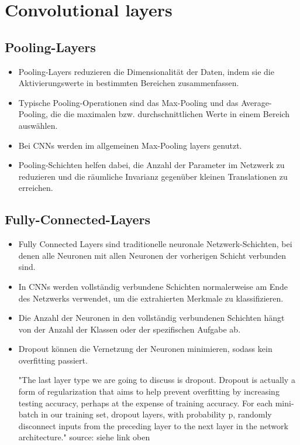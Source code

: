 \section{Convolutional layers}

\subsection{Pooling-Layers}
\begin{itemize}
  \item Pooling-Layers reduzieren die Dimensionalität der Daten, indem sie die Aktivierungswerte in bestimmten Bereichen zusammenfassen.
  \item Typische Pooling-Operationen sind das Max-Pooling und das Average-Pooling, die die maximalen bzw. durchschnittlichen Werte in einem Bereich auswählen.
  \item Bei CNNs werden im allgemeinen Max-Pooling layers genutzt.
  \item Pooling-Schichten helfen dabei, die Anzahl der Parameter im Netzwerk zu reduzieren und die räumliche Invarianz gegenüber kleinen Translationen zu erreichen.
\end{itemize}

\subsection{Fully-Connected-Layers}
\begin{itemize}
  \item Fully Connected Layers sind traditionelle neuronale Netzwerk-Schichten, bei denen alle Neuronen mit allen Neuronen der vorherigen Schicht verbunden sind.
  \item In CNNs werden vollständig verbundene Schichten normalerweise am Ende des Netzwerks verwendet, um die extrahierten Merkmale zu klassifizieren.
  \item Die Anzahl der Neuronen in den vollständig verbundenen Schichten hängt von der Anzahl der Klassen oder der spezifischen Aufgabe ab.
  \item Dropout können die Vernetzung der Neuronen minimieren, sodass kein overfitting passiert.

  "The last layer type we are going to discuss is dropout. Dropout is actually a form of regularization that aims to help prevent overfitting by increasing testing accuracy, perhaps at the expense of training accuracy. For each mini-batch in our training set, dropout layers, with probability p, randomly disconnect inputs from the preceding layer to the next layer in the network architecture." source: siehe link oben
\end{itemize}

